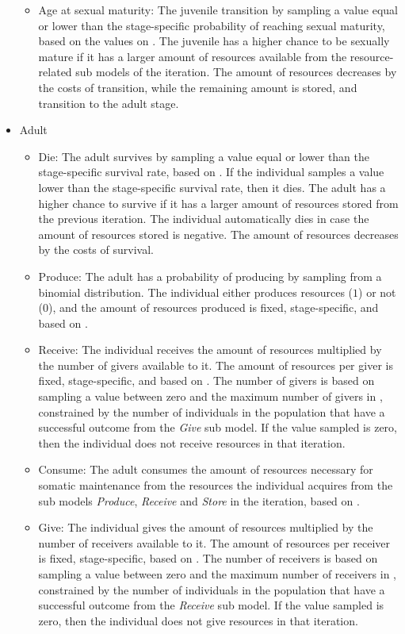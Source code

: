 \documentclass{article}
\begin{document}
\begin{itemize}
\begin{itemize}
        \item Age at sexual maturity: The juvenile transition by sampling a value equal or lower than the stage-specific probability of reaching sexual maturity, based on the values on \citep{ellison2017reproductive}. The juvenile has a higher chance to be sexually mature if it has a larger amount of resources available from the resource-related sub models of the iteration. The amount of resources decreases by the costs of transition, while the remaining amount is stored, and transition to the adult stage.
    \end{itemize}
    \item Adult
    \begin{itemize}
        \item Die: The adult survives by sampling a value equal or lower than the stage-specific survival rate, based on \cite{gurven2007longevity}. If the individual samples a value lower than the stage-specific survival rate, then it dies. The adult has a higher chance to survive if it has a larger amount of resources stored from the previous iteration. The individual automatically dies in case the amount of resources stored is negative. The amount of resources decreases by the costs of survival.
        \item Produce: The adult has a probability of producing by sampling from a binomial distribution. The individual either produces resources ($1$) or not ($0$), and the amount of resources produced is fixed, stage-specific, and based on \cite{koster2020life}.
        \item Receive: The individual receives the amount of resources multiplied by the number of givers available to it. The amount of resources per giver is fixed, stage-specific, and based on \cite{gurven2004give}. The number of givers is based on sampling a value between zero and the maximum number of givers in \cite{gurven2004give}, constrained by the number of individuals in the population that have a successful outcome from the \emph{Give} sub model. If the value sampled is zero, then the individual does not receive resources in that iteration.
        \item Consume: The adult consumes the amount of resources necessary for somatic maintenance from the resources the individual acquires from the sub models \emph{Produce}, \emph{Receive} and \emph{Store} in the iteration, based on \cite{kaplan2000theory, pontzer2021daily}.
        \item Give: The individual gives the amount of resources multiplied by the number of receivers available to it. The amount of resources per receiver is fixed, stage-specific, based on \cite{gurven2004give}. The number of receivers is based on sampling a value between zero and the maximum number of receivers in \cite{gurven2004give}, constrained by the number of individuals in the population that have a successful outcome from the \emph{Receive} sub model. If the value sampled is zero, then the individual does not give resources in that iteration.

\end{itemize}
\end{itemize}
\end{document}

